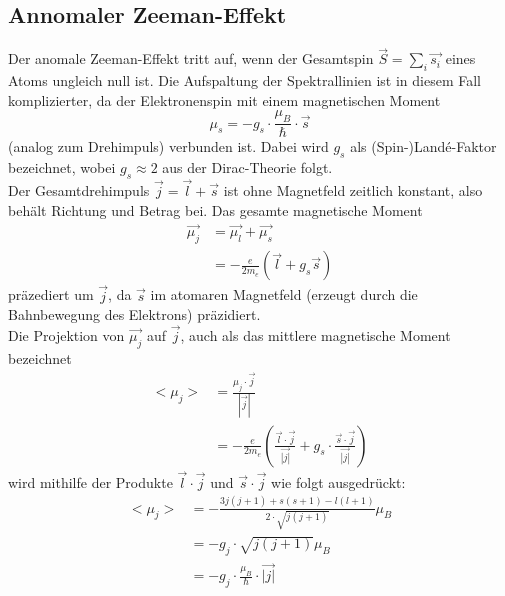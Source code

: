 \subsection{Annomaler Zeeman-Effekt}
Der anomale Zeeman-Effekt tritt auf, wenn der Gesamtspin $\vec{S} = \sum_i \vec{s_i}$ eines Atoms ungleich null ist.
Die Aufspaltung der Spektrallinien ist in diesem Fall komplizierter, da der Elektronenspin mit einem magnetischen Moment
\begin{equation}
    \mu_s = -g_s \cdot \frac{\mu_B}{\hbar} \cdot \vec{s}
    \label{eqn:lande_s}
\end{equation}
(analog zum Drehimpuls) verbunden ist.
Dabei wird $g_s$ als (Spin-)Landé-Faktor bezeichnet, wobei $g_s \approx 2$ aus der Dirac-Theorie folgt.
\\
Der Gesamtdrehimpuls $\vec{j} = \vec{l} + \vec{s}$ ist ohne Magnetfeld zeitlich konstant, also behält Richtung und Betrag bei.
Das gesamte magnetische Moment
\begin{align*}
    \vec{\mu_j} &= \vec{\mu_l} + \vec{\mu_s} \\
    &= - \frac{e}{2m_e}(\vec{l} + g_s \vec{s})
\end{align*}
präzediert um $\vec{j}$, da $\vec{s}$ im atomaren Magnetfeld (erzeugt durch die Bahnbewegung des Elektrons) präzidiert.
\\
Die Projektion von $\vec{\mu_j}$ auf $\vec{j}$, auch als das mittlere magnetische Moment bezeichnet
\begin{align*}
    <\mu_j> &= \frac{\mu_j \cdot \vec{j}}{|\vec{j}|}\\
    &= -\frac{e}{2m_e} \left ( \frac{\vec{l} \cdot \vec{j}}{\vec{|j|}} + g_s \cdot \frac{\vec{s} \cdot \vec{j}}{\vec{|j|}} \right )
\end{align*}
wird mithilfe der Produkte $\vec{l} \cdot \vec{j}$ und $\vec{s} \cdot \vec{j}$ wie folgt ausgedrückt:
\begin{align*}
    <\mu_j> &= - \frac{3j(j+1) + s(s+1) - l(l+1)}{2 \cdot \sqrt{j(j+1)}} \mu_B \\
    &= - g_j \cdot \sqrt{j(j+1)} \mu_B \\
    &= - g_j \cdot \frac{\mu_B}{\hbar} \cdot \vec{|j|}
\end{align*}

